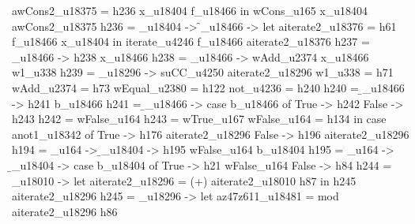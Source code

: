                                                                                            awCons2_u18375 = h236 x_u18404 f_u18466
                                                                                         in wCons_u165 x_u18404 awCons2_u18375
                                                        h236 = \x_u18404 -> \f_u18466 -> let
                                                                                           aiterate2_u18376 = h61 f_u18466 x_u18404
                                                                                         in iterate_u4246 f_u18466 aiterate2_u18376
                                                        h237 = \x_u18466 -> h238 x_u18466
                                                        h238 = \x_u18466 -> wAdd_u2374 x_u18466 w1_u338
                                                        h239 = _u18296 -> suCC_u4250 aiterate2_u18296
                                                        w1_u338 = h71
                                                        wAdd_u2374 = h73
                                                        wEqual_u2380 = h122
                                                        not_u4236 = h240
                                                        h240 = \b_u18466 -> h241 b_u18466
                                                        h241 = \b_u18466 -> case b_u18466 of
                                                                              True -> h242
                                                                              False -> h243
                                                        h242 = wFalse_u164
                                                        h243 = wTrue_u167
                                                        wFalse_u164 = h134
                                                      in case anot1_u18342 of
                                                           True -> h176 aiterate2_u18296
                                                           False -> h196 aiterate2_u18296
         h194 = \wFalse_u164 -> \b_u18404 -> h195 wFalse_u164 b_u18404
         h195 = \wFalse_u164 -> \b_u18404 -> case b_u18404 of
                                               True -> h21 wFalse_u164
                                               False -> h84
         h244 = _u18010 -> let
                                       aiterate2_u18296 = (+) aiterate2_u18010 h87
                                     in h245 aiterate2_u18296
         h245 = _u18296 -> let
                                       az47z611_u18481 = mod aiterate2_u18296 h86
